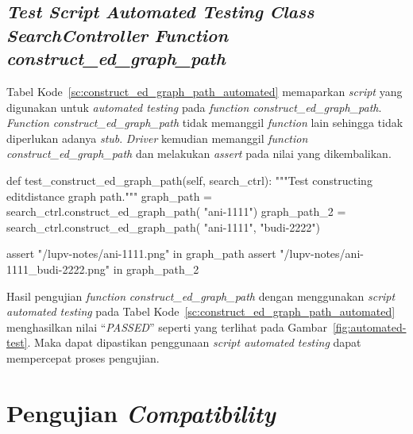 \subsection{\emph{Test Script} \emph{Automated Testing} \emph{Class} \emph{SearchController}
  \emph{Function} \emph{construct\_ed\_graph\_path}}

Tabel Kode~\ref{sc:construct_ed_graph_path_automated} memaparkan
\emph{script} yang digunakan untuk \emph{automated testing} pada
\emph{function construct\_ed\_graph\_path}. \emph{Function
  construct\_ed\_graph\_path} tidak memanggil \emph{function} lain
sehingga tidak diperlukan adanya \emph{stub}. \emph{Driver} kemudian
memanggil \emph{function construct\_ed\_graph\_path} dan melakukan
\emph{assert} pada nilai yang dikembalikan.

\par\null\par
\begin{code}
\begin{ignasicblock}[title=construct\_ed\_graph\_path,minted language=Python]
def test_construct_ed_graph_path(self, search_ctrl):
  """Test constructing editdistance graph path."""
  graph_path = search_ctrl.construct_ed_graph_path(
    "ani-1111")
  graph_path_2 = search_ctrl.construct_ed_graph_path(
   "ani-1111", "budi-2222")

  assert "/lupv-notes/ani-1111.png" in graph_path
  assert "/lupv-notes/ani-1111_budi-2222.png" in graph_path_2
\end{ignasicblock}
  \label{sc:construct_ed_graph_path_automated}
\end{code}

\par\null\par
Hasil pengujian \emph{function} \emph{construct\_ed\_graph\_path} dengan
menggunakan \emph{script} \emph{automated testing} pada Tabel
Kode~\ref{sc:construct_ed_graph_path_automated} menghasilkan nilai ``\emph{PASSED}''
seperti yang terlihat pada Gambar~\ref{fig:automated-test}. Maka dapat
dipastikan penggunaan \emph{script automated testing} dapat mempercepat proses
pengujian.

\section{Pengujian \emph{Compatibility}}

